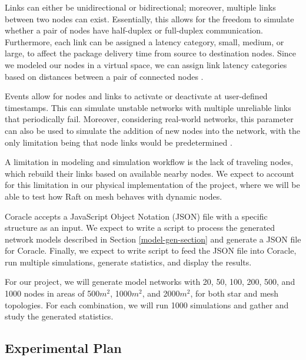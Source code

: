 Links can either be unidirectional or bidirectional; moreover, multiple links between two nodes can exist. Essentially, this allows for the freedom to simulate whether a pair of nodes have half-duplex or full-duplex communication. Furthermore, each link can be assigned a latency category, small, medium, or large, to affect the package delivery time from source to destination nodes. Since we modeled our nodes in a virtual space, we can assign link latency categories based on distances between a pair of connected nodes \cite{howardCoracleEvaluatingConsensus2015}.

Events allow for nodes and links to activate or deactivate at user-defined timestamps. This can simulate unstable networks with multiple unreliable links that periodically fail. Moreover, considering real-world networks, this parameter can also be used to simulate the addition of new nodes into the network, with the only limitation being that node links would be predetermined \cite{howardCoracleEvaluatingConsensus2015}. 

A limitation in modeling and simulation workflow is the lack of traveling nodes, which rebuild their links based on available nearby nodes. We expect to account for this limitation in our physical implementation of the project, where we will be able to test how Raft on mesh behaves with dynamic nodes.

Coracle accepts a JavaScript Object Notation (JSON) file with a specific structure as an input. We expect to write a  script to process the generated network models described in Section \ref{model-gen-section} and generate a JSON file for Coracle. Finally, we expect to write  script to feed the JSON file into Coracle, run multiple simulations, generate statistics, and display the results. 

For our project, we will generate model networks with 20, 50, 100, 200, 500, and 1000 nodes in areas of 500$m^2$, 1000$m^2$, and 2000$m^2$, for both star and mesh topologies. For each combination, we will run 1000 simulations and gather and study the generated statistics.



\vspace{-5pt}
\subsection{Experimental Plan}

